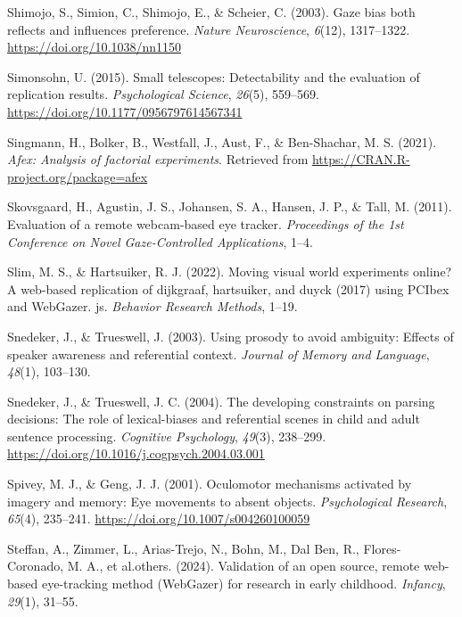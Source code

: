 \documentclass[
  man,floatsintext]{apa6}
\newlength{\cslhangindent}
\newenvironment{CSLReferences}[2] %
 {\begin{list}{}{%
  \setlength{\itemindent}{0pt}
  \setlength{\leftmargin}{0pt}
  \setlength{\parsep}{0pt}
  \ifodd #1
   \setlength{\leftmargin}{\cslhangindent}
   \setlength{\itemindent}{-1\cslhangindent}
  \fi
  \setlength{\itemsep}{#2\baselineskip}}}
 {\end{list}}
\begin{document}
\begin{CSLReferences}{1}{0}
Shimojo, S., Simion, C., Shimojo, E., \& Scheier, C. (2003). Gaze bias both reflects and influences preference. \emph{Nature Neuroscience}, \emph{6}(12), 1317--1322. \url{https://doi.org/10.1038/nn1150}

Simonsohn, U. (2015). Small telescopes: Detectability and the evaluation of replication results. \emph{Psychological Science}, \emph{26}(5), 559--569. \url{https://doi.org/10.1177/0956797614567341}

Singmann, H., Bolker, B., Westfall, J., Aust, F., \& Ben-Shachar, M. S. (2021). \emph{Afex: Analysis of factorial experiments}. Retrieved from \url{https://CRAN.R-project.org/package=afex}

Skovsgaard, H., Agustin, J. S., Johansen, S. A., Hansen, J. P., \& Tall, M. (2011). Evaluation of a remote webcam-based eye tracker. \emph{Proceedings of the 1st Conference on Novel Gaze-Controlled Applications}, 1--4.

Slim, M. S., \& Hartsuiker, R. J. (2022). Moving visual world experiments online? A web-based replication of dijkgraaf, hartsuiker, and duyck (2017) using PCIbex and WebGazer. js. \emph{Behavior Research Methods}, 1--19.

Snedeker, J., \& Trueswell, J. (2003). Using prosody to avoid ambiguity: Effects of speaker awareness and referential context. \emph{Journal of Memory and Language}, \emph{48}(1), 103--130.

Snedeker, J., \& Trueswell, J. C. (2004). The developing constraints on parsing decisions: {The} role of lexical-biases and referential scenes in child and adult sentence processing. \emph{Cognitive Psychology}, \emph{49}(3), 238--299. \url{https://doi.org/10.1016/j.cogpsych.2004.03.001}

Spivey, M. J., \& Geng, J. J. (2001). Oculomotor mechanisms activated by imagery and memory: Eye movements to absent objects. \emph{Psychological Research}, \emph{65}(4), 235--241. \url{https://doi.org/10.1007/s004260100059}

Steffan, A., Zimmer, L., Arias-Trejo, N., Bohn, M., Dal Ben, R., Flores-Coronado, M. A., et al.others. (2024). Validation of an open source, remote web-based eye-tracking method (WebGazer) for research in early childhood. \emph{Infancy}, \emph{29}(1), 31--55.


\end{CSLReferences}
\end{document}
